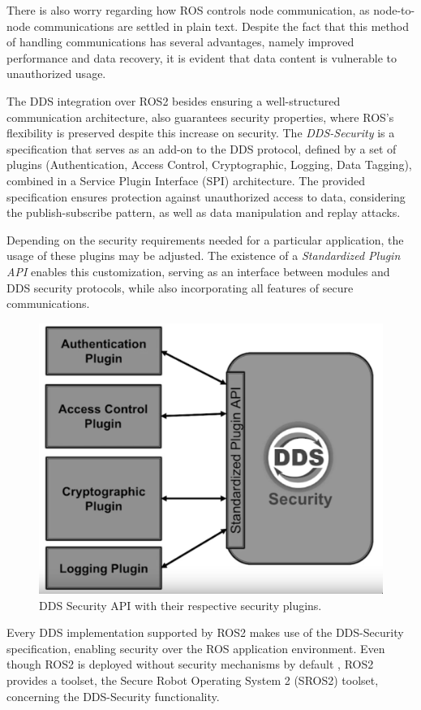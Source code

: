 There is also worry regarding how ROS controls node communication, as node-to-node communications are settled in plain text. Despite the fact that this method of handling communications has several advantages, namely improved performance and data recovery, it is evident that data content is vulnerable to unauthorized usage.

The DDS integration over ROS2 besides ensuring a well-structured communication architecture, also guarantees security properties, where ROS's flexibility is preserved despite this increase on security. The \textit{DDS-Security} \cite{dds-s} is a specification that serves as an add-on to the DDS protocol, defined by a set of plugins (Authentication, Access Control, Cryptographic, Logging, Data Tagging), combined in a Service Plugin Interface (SPI) architecture. The provided specification ensures protection against unauthorized access to data, considering the publish-subscribe pattern, as well as data manipulation and replay attacks. \cite{8442103, ros-dds-integration}

Depending on the security requirements needed for a particular application, the usage of these plugins  may be adjusted. The existence of a \textit{Standardized Plugin API} enables this customization, serving as an interface between modules and DDS security protocols, while also incorporating all features of secure communications. 

\begin{figure}[H]
    \centering
    \includegraphics[width=0.5\linewidth]{images/dds-security.png}
    \caption{DDS Security API with their respective security plugins.}
    \label{fig:dds-security}
\end{figure}

Every DDS implementation supported by ROS2 makes use of the DDS-Security specification, enabling security over the ROS application environment. Even though ROS2 is deployed without security mechanisms by default \cite{ros-dds-integration}, ROS2 provides a toolset, the Secure Robot Operating System 2 (SROS2) toolset, concerning the DDS-Security functionality.

